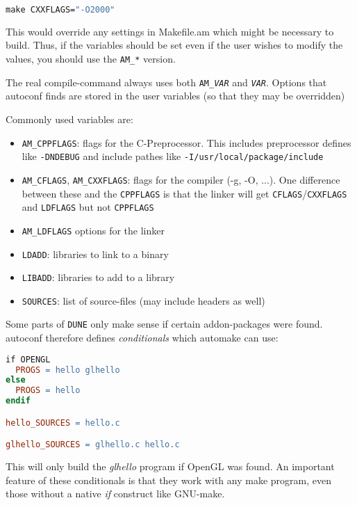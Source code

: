 \documentclass[11pt,a4paper,headinclude,footinclude,DIV16,normalheadings]{scrartcl}
\newcommand{\dune}{\texttt{DUNE}\xspace}
\begin{document}
\begin{lstlisting}[language=make]
make CXXFLAGS="-O2000"
\end{lstlisting}

This would override any settings in Makefile.am which might be
necessary to build. Thus, if the variables should be set even if the
user wishes to modify the values, you should use the \texttt{AM\_*}
version. 

The real compile-command always uses both \texttt{AM\_\textit{VAR}} and
\texttt{\textit{VAR}}. Options that
autoconf finds are stored in the user variables (so that they may be
overridden) 

Commonly used variables are:
\begin{itemize}
\item \texttt{AM\_CPPFLAGS}: flags for the C-Preprocessor. This
  includes preprocessor defines like \texttt{-DNDEBUG} and include
  pathes like \texttt{-I/usr/local/package/include}
\item \texttt{AM\_CFLAGS}, \texttt{AM\_CXXFLAGS}: flags for the
  compiler (-g, -O, ...). One difference between these and the
  \texttt{CPPFLAGS} is that the linker will get
  \texttt{CFLAGS}/\texttt{CXXFLAGS} and \texttt{LDFLAGS} but not
  \texttt{CPPFLAGS}
\item \texttt{AM\_LDFLAGS} options for the linker
\item \texttt{LDADD}: libraries to link to a binary
\item \texttt{LIBADD}: libraries to add to a library
\item \texttt{SOURCES}: list of source-files (may include headers as well)
\end{itemize}


Some parts of \dune only make sense if certain addon-packages were
found. autoconf therefore defines {\em conditionals} which automake can
use:

\begin{lstlisting}[language=make]
if OPENGL
  PROGS = hello glhello
else
  PROGS = hello
endif

hello_SOURCES = hello.c

glhello_SOURCES = glhello.c hello.c
\end{lstlisting}

This will only build the {\em glhello} program if OpenGL was found. An
important feature of these conditionals is that they work with any
make program, even those without a native {\em if} construct like GNU-make.
\end{document}
